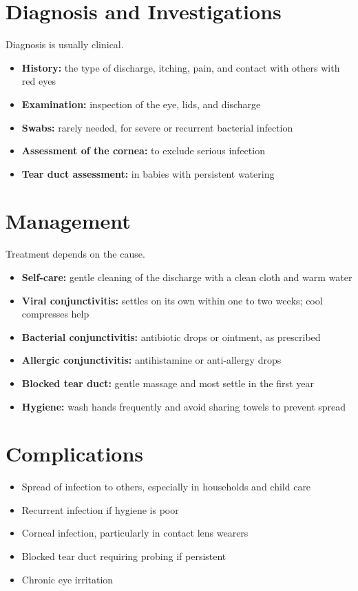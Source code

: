 \section*{Diagnosis and Investigations}
Diagnosis is usually clinical.
\begin{itemize}
    \item \textbf{History:} the type of discharge, itching, pain, and contact with others with red eyes
    \item \textbf{Examination:} inspection of the eye, lids, and discharge
    \item \textbf{Swabs:} rarely needed, for severe or recurrent bacterial infection
    \item \textbf{Assessment of the cornea:} to exclude serious infection
    \item \textbf{Tear duct assessment:} in babies with persistent watering
\end{itemize}

\section*{Management}
Treatment depends on the cause.
\begin{itemize}
    \item \textbf{Self-care:} gentle cleaning of the discharge with a clean cloth and warm water
    \item \textbf{Viral conjunctivitis:} settles on its own within one to two weeks; cool compresses help
    \item \textbf{Bacterial conjunctivitis:} antibiotic drops or ointment, as prescribed
    \item \textbf{Allergic conjunctivitis:} antihistamine or anti-allergy drops
    \item \textbf{Blocked tear duct:} gentle massage and most settle in the first year
    \item \textbf{Hygiene:} wash hands frequently and avoid sharing towels to prevent spread
\end{itemize}

\section*{Complications}
\begin{itemize}
    \item Spread of infection to others, especially in households and child care
    \item Recurrent infection if hygiene is poor
    \item Corneal infection, particularly in contact lens wearers
    \item Blocked tear duct requiring probing if persistent
    \item Chronic eye irritation
\end{itemize}

